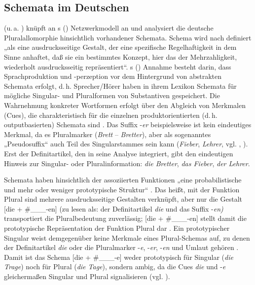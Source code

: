 \subsection{Schemata im Deutschen}
\label{sec:5.3.2}
\citeauthor{Köpcke1988} (u.\,a. \citeyear{Köpcke1988, Köpcke1993}) knüpft an \citeauthor{Bybee1988}s (\citeyear{Bybee1985b, Bybee1988}) Netzwerkmodell an und analysiert die deutsche Pluralallomorphie hinsichtlich vorhandener Schemata. Schema wird nach \citet[72]{Köpcke1993} definiert „als eine ausdrucksseitige Gestalt, der eine spezifische Regelhaftigkeit in dem Sinne anhaftet, daß sie ein bestimmtes Konzept, hier das der Mehrzahligkeit, wiederholt ausdrucksseitig repräsentiert“. \citeauthor{Köpcke1988}s (\citeyear{Köpcke1988, Köpcke1993}) Annahme besteht darin, dass Sprachproduktion und -perzeption vor dem Hintergrund von abstrakten Schemata erfolgt, d.\,h. Sprecher/Hörer haben in ihrem Lexikon Schemata für mögliche Singular- und Pluralformen von Substantiven gespeichert. Die Wahrnehmung konkreter Wortformen erfolgt über den Abgleich von Merkmalen (Cues), die charakteristisch für die einzelnen produktorientierten (d.\,h. outputbasierten) Schemata sind \citep[322]{Köpcke1988}. Das Suffix -\textit{er} beispielsweise ist kein eindeutiges Merkmal, da es Pluralmarker (\textit{Brett} -- \textit{Bretter}), aber als sogenanntes „Pseudosuffix“ auch Teil des Singularstammes sein kann (\textit{Fieber}, \textit{Lehrer}, vgl. \citealt[111--113]{Köpcke1993}, \citealt{KöpckePanther2016}). Erst der Definitartikel, den \citet{Köpcke1988, Köpcke1993} in seine Analyse integriert, gibt den eindeutigen Hinweis zur Singular- oder Pluralinformation: \textit{die Bretter}, \textit{das Fieber}, \textit{der Lehrer}.

\begin{sloppypar}
Schemata haben hinsichtlich der assoziierten Funktionen „eine probabilistische und mehr oder weniger prototypische Struktur“ \citep[82]{Köpcke1994}. Das heißt, mit der Funktion Plural sind mehrere ausdrucksseitige Gestalten verknüpft, aber nur die Gestalt [die + \#\_\_\_-en] (zu lesen als: der Definitartikel \textit{die} und das Suffix -\textit{en)} transportiert die Pluralbedeutung zuverlässig; [die + \#\_\_\_-en] stellt damit die prototypische Repräsentation der Funktion Plural dar \citep[72]{Köpcke1993}. Ein prototypischer Singular weist demgegenüber keine Merkmale eines Plural-Schemas auf, zu denen der Definitartikel \textit{die} oder die Pluralmarker -\textit{e}, -\textit{er}, -\textit{en} und Umlaut gehören \citep[321]{Köpcke1988}. Damit ist das Schema [die + \#\_\_\_-e] weder prototypisch für Singular (\textit{die Trage}) noch für Plural (\textit{die Tage}), sondern ambig, da die Cues \textit{die} und -\textit{e} gleichermaßen Singular und Plural signalisieren (vgl. \citealt[88]{Köpcke1993}).
\end{sloppypar}

